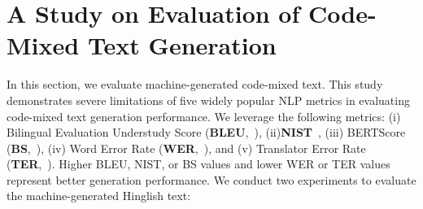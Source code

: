 \documentclass[11pt]{article}
\begin{document}
\section{A Study on Evaluation of Code-Mixed Text Generation}
In this section, we evaluate machine-generated code-mixed text. This study demonstrates severe limitations of five widely popular NLP metrics in evaluating code-mixed text generation performance. We leverage the following metrics: (i) Bilingual Evaluation Understudy Score (\textbf{BLEU},~\citet{papineni2002bleu}), (ii)\textbf{NIST}~\cite{doddington2002automatic}, (iii) BERTScore (\textbf{BS},~\citet{zhang2019bertscore}), (iv) Word Error Rate (\textbf{WER},~\citet{levenshtein1966binary}), and (v) Translator Error Rate (\textbf{TER},~\citet{snover2006study}). Higher BLEU, NIST, or BS values and lower WER or TER values represent better generation performance. We conduct two experiments to evaluate the machine-generated Hinglish text:
\end{document}
